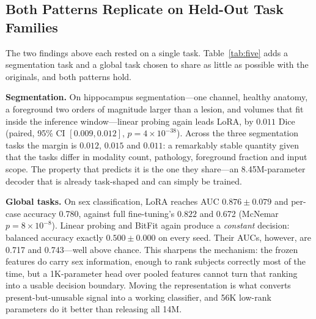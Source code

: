 \documentclass[journal,twoside,web]{ieeecolor}
\begin{document}
\subsection{Both Patterns Replicate on Held-Out Task Families}
\label{sec:res_replicate}

The two findings above each rested on a single task. Table~\ref{tab:five} adds a segmentation task and a global task chosen to share as little as possible with the originals, and both patterns hold.

\textbf{Segmentation.} On hippocampus segmentation---one channel, healthy anatomy, a foreground two orders of magnitude larger than a lesion, and volumes that fit inside the inference window---linear probing again leads LoRA, by $0.011$ Dice (paired, 95\% CI $[0.009, 0.012]$, $p=4{\times}10^{-38}$). Across the three segmentation tasks the margin is $0.012$, $0.015$ and $0.011$: a remarkably stable quantity given that the tasks differ in modality count, pathology, foreground fraction and input scope. The property that predicts it is the one they share---an 8.45M-parameter decoder that is already task-shaped and can simply be trained.

\textbf{Global tasks.} On sex classification, LoRA reaches AUC $0.876\pm0.079$ and per-case accuracy 0.780, against full fine-tuning's $0.822$ and 0.672 (McNemar $p=8{\times}10^{-8}$). Linear probing and BitFit again produce a \emph{constant} decision: balanced accuracy exactly $0.500\pm0.000$ on every seed. Their AUCs, however, are 0.717 and 0.743---well above chance. This sharpens the mechanism: the frozen features do carry sex information, enough to rank subjects correctly most of the time, but a 1K-parameter head over pooled features cannot turn that ranking into a usable decision boundary. Moving the representation is what converts present-but-unusable signal into a working classifier, and 56K low-rank parameters do it better than releasing all 14M.
\end{document}
